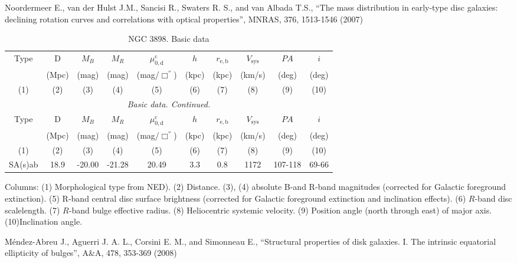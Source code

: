 \documentclass[english,10pt]{article}
\def\mm{\mathrm}
\begin{document}
\bigskip
\noindent
Noordermeer E., van der Hulst J.M., Sancisi R., 
Swaters R. S., and van Albada T.S., 
``The mass distribution in early-type disc galaxies: declining rotation
curves and correlations with optical properties'', 
MNRAS, 376, 1513-1546 (2007)

\begin{longtable}[c]{cccccccccc}
\caption{NGC 3898. Basic data} \\ 
\hline 
Type & D & $M_B$ & $M_R$ & $\mu_\mm{0,d}^\mm{c}$ & $h$ & $r_\mm{e,b}$
& $V_\mm{sys}$ & $PA$ & $i$ \\ 
& (Mpc) & (mag) & (mag) & (mag/$\Box^{''}$) & (kpc) & (kpc)
& (km/s) & (deg) & (deg) \\
(1)&(2)&(3)&(4)&(5)&(6)&(7)&(8)&(9)&(10) \\ 
\hline
\endfirsthead 
\hline
\multicolumn{10}{c}{\small\slshape Basic data. 
Continued. } \\ \hline
Type & D & $M_B$ & $M_R$ & $\mu_\mm{0,d}^\mm{c}$ & $h$ & $r_\mm{e,b}$
& $V_\mm{sys}$ & $PA$ & $i$ \\ 
& (Mpc) & (mag) & (mag) & (mag/$\Box^{''}$) & (kpc) & (kpc)
& (km/s) & (deg) & (deg) \\
(1)&(2)&(3)&(4)&(5)&(6)&(7)&(8)&(9)&(10) \\ 
\hline
\endhead 
\hline
SA(s)ab & 18.9 & -20.00 & -21.28 & 20.49 & 3.3 & 0.8 
& 1172 & 107-118 & 69-66 \tabularnewline
\hline
\end{longtable}

Columns: 
(1) Morphological type from NED). 
(2) Distance. 
(3), (4) absolute B-and R-band magnitudes 
(corrected for Galactic foreground extinction).
(5) R-band central disc surface brightness 
(corrected for Galactic foreground extinction and inclination effects).
(6) $R$-band disc scalelength.
(7) $R$-band bulge effective radius.
(8) Heliocentric systemic velocity.
(9) Position angle (north through east) of major axis. 
(10)Inclination angle.

\bigskip
\noindent
M\'{e}ndez-Abreu J., Aguerri J. A. L., Corsini E. M., 
and Simonneau E., 
``Structural properties of disk galaxies. I. The intrinsic 
equatorial ellipticity of bulges'', 
A\&A, 478, 353-369 (2008)
\end{document}
